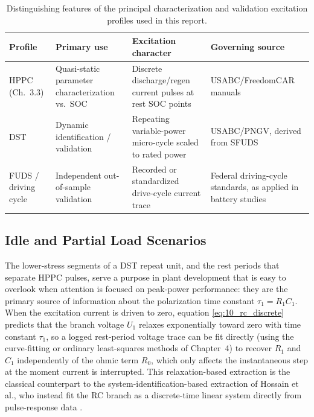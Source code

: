 \begin{table}[htbp]
\centering
\caption{Distinguishing features of the principal characterization and validation excitation profiles used in this report.}
\label{tab:10_profiles}
\begin{tabular}{p{2.3cm}p{3.6cm}p{3.6cm}p{2.6cm}}
\toprule
\textbf{Profile} & \textbf{Primary use} & \textbf{Excitation character} & \textbf{Governing source} \\
\midrule
HPPC (Ch.~3.3) & Quasi-static parameter characterization vs.\ SOC & Discrete discharge/regen current pulses at rest SOC points & USABC/FreedomCAR manuals \cite{usabc_manual,freedomcar2003} \\
DST & Dynamic identification / validation & Repeating variable-power micro-cycle scaled to rated power & USABC/PNGV, derived from SFUDS \cite{usabc_manual} \\
FUDS / driving cycle & Independent out-of-sample validation & Recorded or standardized drive-cycle current trace & Federal driving-cycle standards, as applied in battery studies \cite{exogenous_kf_soc} \\
\bottomrule
\end{tabular}
\end{table}

\subsection{Idle and Partial Load Scenarios}
\label{sec:10_3_1}

The lower-stress segments of a DST repeat unit, and the rest periods
that separate HPPC pulses, serve a purpose in plant development that
is easy to overlook when attention is focused on peak-power
performance: they are the primary source of information about the
polarization time constant $\tau_1 = R_1 C_1$. When the excitation
current is driven to zero, equation \eqref{eq:10_rc_discrete}
predicts that the branch voltage $U_1$ relaxes exponentially toward
zero with time constant $\tau_1$, so a logged rest-period voltage
trace can be fit directly (using the curve-fitting or ordinary
least-squares methods of Chapter~4) to recover $R_1$ and $C_1$
independently of the ohmic term $R_0$, which only affects the
instantaneous step at the moment current is interrupted. This
relaxation-based extraction is the classical counterpart to the
system-identification-based extraction of Hossain et al., who instead
fit the RC branch as a discrete-time linear system directly from
pulse-response data \cite{hossain2019}.

